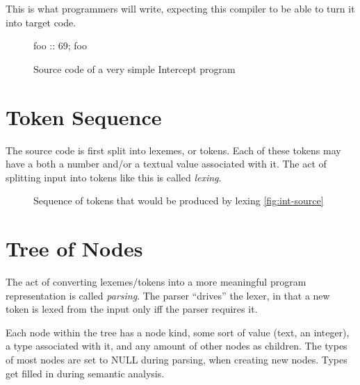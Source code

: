 \documentclass[12pt]{article}
\begin{document}
\par
This is what programmers will write, expecting this compiler to be able to turn it into target code.

\begin{figure}[ht]
  \centering
  foo :: 69; foo
  \caption{Source code of a very simple Intercept program}
  \label{fig:int-source}
\end{figure}

\section{Token Sequence}
\label{sec:tokens}

The source code is first split into lexemes, or tokens. Each of these tokens may have a both a number and/or a textual value associated with it. The act of splitting input into tokens like this is called \emph{lexing}.

\begin{figure}[ht]
  \centering
  \caption{Sequence of tokens that would be produced by lexing \autoref{fig:int-source}}
  \label{fig:int-tokens}
\end{figure}

\section{Tree of Nodes}
\label{sec:node-tree}

The act of converting lexemes/tokens into a more meaningful program representation is called \emph{parsing}. The parser ``drives'' the lexer, in that a new token is lexed from the input only iff the parser requires it.

Each node within the tree has a node kind, some sort of value (text, an integer), a type associated with it, and any amount of other nodes as children. The types of most nodes are set to NULL during parsing, when creating new nodes. Types get filled in during semantic analysis.
\end{document}
